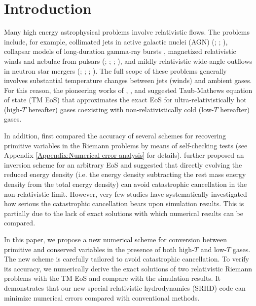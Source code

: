 \documentclass[twocolumn]{aastex63}
\begin{document}
\section{Introduction}
Many high energy astrophysical problems involve relativistic flows.
The problems include, for example, collimated jets in active galactic nuclei (AGN)
(\citealt{Chiueh-1991ApJ...377..462C};
\citealt{Chiueh-1992ApJ...394..459L};
\citealt{Blandford2018}),
collapsar models of long-duration gamma-ray bursts \citep{LongGRB},
magnetized relativistic winds and nebulae from pulsars
(\citealt{1984ApJ...283..694K}; \citealt{1984ApJ...283..710K};
\citealt{Chiue-PhysRevLett.63.113}; \citealt{Chiueh_1998}), and mildly relativistic
wide-angle outflows in neutron star mergers
(\citealt{NM2}; \citealt{NM1}; \citealt{NM3}; \citealt{NM4}).
The full scope of these problems generally involves substantial temperature changes between
jets (winds) and ambient gases. For this reason, the pioneering works of
\cite{Taub}, \cite{TM_EOS}, and \cite{Compare_TM_EOS} suggested Taub-Mathews equation of
state (TM EoS) that approximates the exact EoS \citep{Synge} for
ultra-relativistically hot (high-$T$ hereafter) gases coexisting with non-relativistically
cold (low-$T$ hereafter) gases.

In addition, \cite{Noble_2006} first compared the accuracy of several schemes for
recovering primitive variables in the Riemann problems by means of self-checking tests
(see Appendix \ref{Appendix:Numerical error analysis} for details).
\cite{NR_Limit} further proposed an inversion scheme for an arbitrary EoS and
suggested that directly evolving the reduced energy density (i.e. the energy density
subtracting the rest mass energy density from the total energy density) can avoid
catastrophic cancellation in the non-relativistic limit.
However, very few studies have systematically investigated how serious the catastrophic
cancellation bears upon simulation results. This is partially due to the lack of
exact solutions with which numerical results can be compared.

In this paper, we propose a new numerical scheme for conversion between primitive and
conserved variables in the presence of both high-$T$ and low-$T$ gases.
The new scheme is carefully tailored to avoid catastrophic cancellation.
To verify its accuracy, we numerically derive the exact solutions of two relativistic
Riemann problems with the TM EoS and compare with the simulation results.
It demonstrates that our new special relativistic hydrodynamics (SRHD) code can
minimize numerical errors compared with conventional methods.
\end{document}
